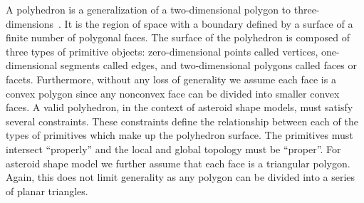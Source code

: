 A polyhedron is a generalization of a two-dimensional polygon to three-dimensions~\cite{orourke1998}.
It is the region of space with a boundary defined by a surface of a finite number of polygonal faces.
The surface of the polyhedron is composed of three types of primitive objects: zero-dimensional points called vertices, one-dimensional segments called edges, and two-dimensional polygons called faces or facets.
Furthermore, without any loss of generality we assume each face is a convex polygon since any nonconvex face can be divided into smaller convex faces.
A valid polyhedron, in the context of asteroid shape models, must satisfy several constraints.
These constraints define the relationship between each of the types of primitives which make up the polyhedron surface.
The primitives must intersect ``properly'' and the local and global topology must be ``proper''.
For asteroid shape model we further assume that each face is a triangular polygon. 
Again, this does not limit generality as any polygon can be divided into a series of planar triangles.

